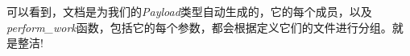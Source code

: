 可以看到，文档是为我们的\textit{Payload}类型自动生成的，它的每个成员，以及\textit{perform\_work}函数，包括它的每个参数，都会根据定义它们的文件进行分组。就是整洁!

























